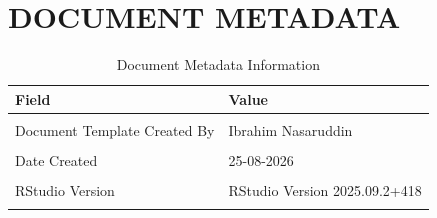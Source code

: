 \documentclass[
]{article}
\begin{document}
\clearpage

\section{DOCUMENT METADATA}\label{document-metadata}

\begin{table}[!h]
\centering
\caption{\label{tab:document_metadata}Document Metadata Information}
\centering
\begin{tabular}[t]{ll}
\toprule
Field & Value\\
\midrule
\cellcolor{gray!10}{Version} & \cellcolor{gray!10}{v2.0}\\
Document Template Created By & Ibrahim Nasaruddin\\
\cellcolor{gray!10}{Document Revised By} & \cellcolor{gray!10}{Justin Tan, Schvelle Ng}\\
Date Created & 25-08-2026\\
\cellcolor{gray!10}{R Version} & \cellcolor{gray!10}{R version 4.5.0 (2025-04-11)}\\
\addlinespace
RStudio Version & RStudio Version 2025.09.2+418\\
\cellcolor{gray!10}{Software Used} & \cellcolor{gray!10}{Hudl Sportscode}\\
\bottomrule
\end{tabular}
\end{table}
\end{document}
